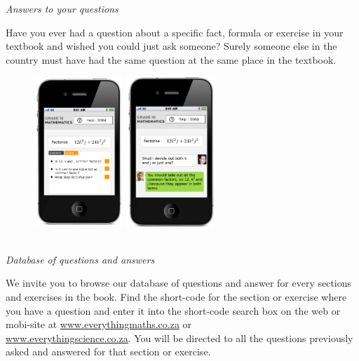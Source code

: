 

\newpage
\thispagestyle{empty}

{\normalfont\sffamily\fontsize{22}\normalfont\itshape Answers to your questions} \par

{\Normalsize

Have you ever had a question about a specific fact, formula or exercise in your textbook and wished you could just ask someone? Surely someone else in the country must have had the same question at the same place in the textbook.\par 
\begin{figure}[h]
\centering
\includegraphics[width=0.3\textwidth]{title_images/QADatabase2.png}
\includegraphics[width=0.3\textwidth]{title_images/AskQuestions3.png}
\end{figure}
\vspace{6pt}\\
{\normalfont\sffamily\fontsize{16}\normalfont\itshape Database of questions and answers} \par
We invite you to browse our database of questions and answer for every sections and exercises in the
book. Find the short-code for the section or exercise where you have a question and enter it into the
short-code search box on the web or mobi-site at \underline{www.everythingmaths.co.za} or\\
\underline{www.everythingscience.co.za}. You will be directed to all the questions previously asked and answered
for that section or exercise.\par

}
